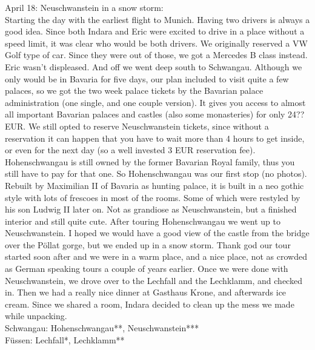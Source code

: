 April 18: Neuschwanstein in a snow storm:\\
Starting the day with the earliest flight to Munich. Having two drivers is always a good idea. Since both Indara and Eric were excited to drive in a place without a speed limit, it was clear who would be both drivers. We originally reserved a VW Golf type of car. Since they were out of those, we got a Mercedes B class instead. Eric wasn't displeased. And off we went deep south to Schwangau. Although we only would be in Bavaria for five days, our plan included to visit quite a few palaces, so we got the two week palace tickets by the Bavarian palace administration (one single, and one couple version). It gives you access to almost all important Bavarian palaces and castles (also some monasteries) for only 24?? EUR. We still opted to reserve Neuschwanstein tickets, since without a reservation it can happen that you have to wait more than 4 hours to get inside, or even for the next day (so a well invested 3 EUR reservation fee). Hohenschwangau is still owned by the former Bavarian Royal family, thus you still have to pay for that one. So Hohenschwangau was our first stop (no photos). Rebuilt by Maximilian II of Bavaria as hunting palace, it is built in a neo gothic style with lots of frescoes in most of the rooms. Some of which were restyled by his son Ludwig II later on. Not as grandiose as Neuschwanstein, but a finished interior and still quite cute. After touring Hohenschwangau we went up to Neuschwanstein. I hoped we would have a good view of the castle from the bridge over the P\"ollat gorge, but we ended up in a snow storm. Thank god our tour started soon after and we were in a warm place, and a nice place, not as crowded as German speaking tours a couple of years earlier. Once we were done with Neuschwanstein, we drove over to the Lechfall and the Lechklamm, and checked in. Then we had a really nice dinner at Gasthaus Krone, and afterwards ice cream. Since we shared a room, Indara decided to clean up the mess we made while unpacking.\\

Schwangau: Hohenschwangau**, Neuschwanstein***\\
F\"ussen: Lechfall*, Lechklamm**\\


